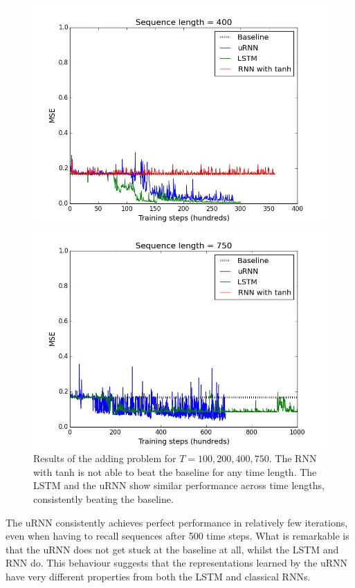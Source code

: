 \documentclass{article} %
\begin{document}
\begin{figure}[t!]
\begin{minipage}[b]{0.5\linewidth}
    \includegraphics[scale=0.25]{figures/adding_400.jpeg}
    \end{minipage}%
  \begin{minipage}[b]{0.5\linewidth}
    \centering
    \includegraphics[scale=0.25]{figures/adding_750.jpeg}
  \end{minipage} 
  \caption{Results of the adding problem for $T=100, 200, 400, 750$. The RNN with tanh
	  is not able to beat the baseline for any time length. The LSTM and the uRNN show similar 
	  performance across time lengths, consistently beating the baseline.}
\end{figure}

The uRNN consistently achieves perfect performance in relatively few iterations, even when having to recall
sequences after 500 time steps. What is remarkable is that the uRNN does not get stuck at the baseline at 
all, whilst the LSTM and RNN do. This behaviour suggests that the representations learned by the uRNN
have very different properties from both the LSTM and classical RNNs. 
\end{document}
